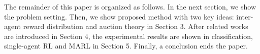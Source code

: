 The remainder of this paper is organized as follows. 
In the next section, we show the problem setting.
Then, we show proposed method with two key ideas: inter-agent reward distribution and auction theory in Section 3. 
After related works are introduced in Section 4, the experimental results are shown in classification, single-agent RL and MARL in Section 5.
Finally, a conclusion ends the paper.
